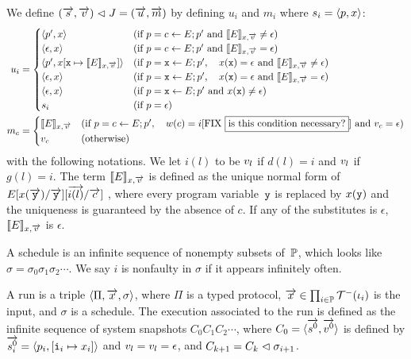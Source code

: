 {We define $
(\overrightarrow s, \overrightarrow v) \vartriangleleft J = (\overrightarrow u, \overrightarrow m)
$ by defining
$u_i$ and $m_i$
where $s_i = \langle{p,x}\rangle$:
\begin{align*}
 u_i & =
 \begin{cases}
 \langle{p',x}\rangle  & (\text{if } p = c
 \leftarrow E; p' \text{ and }\llbracket{E}\rrbracket_{x,\overrightarrow v} \neq \epsilon)
 \\
 \langle{\epsilon,x}\rangle  & (\text{if } p = c
 \leftarrow E; p' \text{ and }\llbracket{E}\rrbracket_{x,\overrightarrow v} = \epsilon)
 \\
 \langle{p', x[\texttt{x} \mapsto \llbracket{E}\rrbracket_{x, \overrightarrow v}]}\rangle&
                       (\text{if } p = \texttt{x} \leftarrow E; p', \quad
 x(\texttt{x}) = \epsilon  \text{ and } \llbracket{E}\rrbracket_{x, \overrightarrow v} \neq \epsilon) \\
 \langle{\epsilon, x}\rangle&
                      (\text{if } p = \texttt{x} \leftarrow E; p',  \quad
 x(\texttt{x}) = \epsilon  \text{ and } \llbracket{E}\rrbracket_{x, \overrightarrow v} = \epsilon) \\
 \langle{\epsilon, x}\rangle & (\text{if } p = \texttt{x} \leftarrow E; p' \text{
 and }
 x(\texttt{x}) \neq \epsilon) \\
 s_i & (\text{if } p = \epsilon)
 \end{cases}\\
 {m}_{c} & =
 \begin{cases}
 \llbracket{E}\rrbracket_{x, \overrightarrow v} & (\text{if } p = c \leftarrow E; p',\quad w(c)= i
  \text{[FIX \fbox{is this condition necessary?}]
 and } {v}_{c} = \epsilon) \\
 {v}_{c} &(\text{otherwise})
 \end{cases}\\
\end{align*}
with the following notations.
We let $i(l)$ to be ${v}_{l}$ if $d(l)=i$ and
${v}_{l}$ if $g(l) = i$.
The term
$\llbracket{E}\rrbracket_{x, \overrightarrow v}$ is defined as the unique normal form
of $E[x(\overrightarrow{\texttt{y}}) / \overrightarrow{\texttt{y}}][\overrightarrow{i(l)}/\overrightarrow c]$ , where
every program variable~$\texttt{y}$ is replaced by $x(\texttt{y})$ and the
uniqueness is guaranteed by the absence of $c$.
If any of the substitutes is $\epsilon$,
$\llbracket{E}\rrbracket_{x, \overrightarrow v}$ is $\epsilon$.

A schedule is an infinite sequence of nonempty subsets of~$\mathbb{P}$,
which looks like $\sigma = \sigma_0\sigma_1\sigma_2\cdots$.
We say $i$ is nonfaulty in $\sigma$
if it appears infinitely often.

A run is a triple $\langle{\Pi, \overrightarrow x, \sigma}\rangle$,
where $\Pi$ is a typed protocol,
$\overrightarrow x \in \prod_{i\in \mathbb{P}} \mathcal{T}^-(\iota_i)$ is the input,
and $\sigma$ is a schedule.
The execution associated to the run
is defined as the infinite sequence of system snapshots
$C_0C_1C_2\cdots$, where $C_0 = \langle{\overrightarrow{s^0}, \overrightarrow{v^0}}\rangle$ is
defined by $\overrightarrow{s^0_i} = \langle{p_i, [\texttt{i}_i\mapsto x_i]}\rangle$ and
${v}_{l}  = {v}_{l} = \epsilon$,
and $C_{k+1} = C_{k}\vartriangleleft
\sigma_{i+1}$.

}
